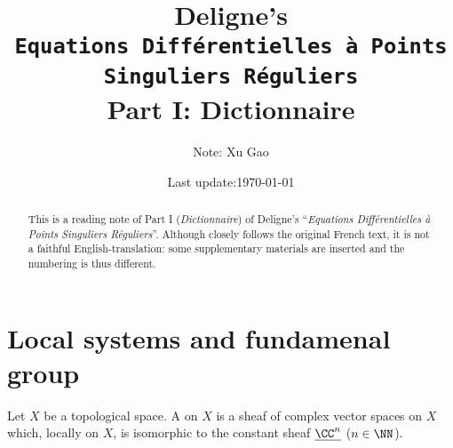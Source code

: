 



%
%

%
%
\title{
Deligne's  \bigskip \\
\texttt{\Huge Equations Diff\'{e}rentielles \`{a} Points Singuliers R\'{e}guliers}\\
Part I: Dictionnaire
}
\author{
Note: Xu Gao
}
\date{
Last update:\today
}


\maketitle
\begin{abstract}
  This is a reading note of Part I (\emph{Dictionnaire}) of Deligne's
  ``\emph{Equations Diff\'{e}rentielles \`{a} Points Singuliers R\'{e}guliers}''.
  Although closely follows the original French text, it is not a faithful
  English-translation: some supplementary materials are inserted and the
  numbering is thus different.
\end{abstract}

\tableofcontents
\clearpage

\section{Local systems and fundamenal group}

\begin{definition}
  Let $X$ be a topological space. A  on $X$ is a
  sheaf of complex vector spaces on $X$ which, locally on $X$, is isomorphic to
  the constant sheaf $\underline{\CC^n}$ ($n\in\NN$).
\end{definition}

